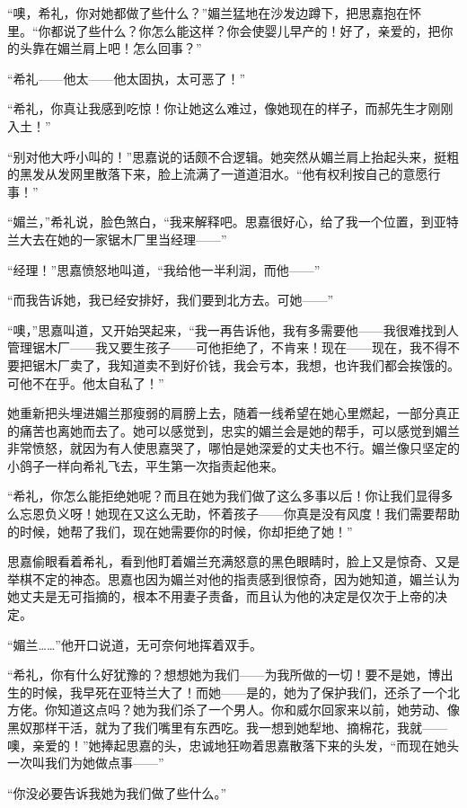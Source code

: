 \par “噢，希礼，你对她都做了些什么？”媚兰猛地在沙发边蹲下，把思嘉抱在怀里。“你都说了些什么？你怎么能这样？你会使婴儿早产的！好了，亲爱的，把你的头靠在媚兰肩上吧！怎么回事？”
\par “希礼——他太——他太固执，太可恶了！”
\par “希礼，你真让我感到吃惊！你让她这么难过，像她现在的样子，而郝先生才刚刚入土！”
\par “别对他大呼小叫的！”思嘉说的话颇不合逻辑。她突然从媚兰肩上抬起头来，挺粗的黑发从发网里散落下来，脸上流满了一道道泪水。“他有权利按自己的意愿行事！”
\par “媚兰，”希礼说，脸色煞白，“我来解释吧。思嘉很好心，给了我一个位置，到亚特兰大去在她的一家锯木厂里当经理——”
\par “经理！”思嘉愤怒地叫道，“我给他一半利润，而他——”
\par “而我告诉她，我已经安排好，我们要到北方去。可她——”
\par “噢，”思嘉叫道，又开始哭起来，“我一再告诉他，我有多需要他——我很难找到人管理锯木厂——我又要生孩子——可他拒绝了，不肯来！现在——现在，我不得不要把锯木厂卖了，我知道卖不到好价钱，我会亏本，我想，也许我们都会挨饿的。可他不在乎。他太自私了！”
\par 她重新把头埋进媚兰那瘦弱的肩膀上去，随着一线希望在她心里燃起，一部分真正的痛苦也离她而去了。她可以感觉到，忠实的媚兰会是她的帮手，可以感觉到媚兰非常愤怒，就因为有人使思嘉哭了，哪怕是她深爱的丈夫也不行。媚兰像只坚定的小鸽子一样向希礼飞去，平生第一次指责起他来。
\par “希礼，你怎么能拒绝她呢？而且在她为我们做了这么多事以后！你让我们显得多么忘恩负义呀！她现在又这么无助，怀着孩子——你真是没有风度！我们需要帮助的时候，她帮了我们，现在她需要你的时候，你却拒绝了她！”
\par 思嘉偷眼看着希礼，看到他盯着媚兰充满怒意的黑色眼睛时，脸上又是惊奇、又是举棋不定的神态。思嘉也因为媚兰对他的指责感到很惊奇，因为她知道，媚兰认为她丈夫是无可指摘的，根本不用妻子责备，而且认为他的决定是仅次于上帝的决定。
\par “媚兰……”他开口说道，无可奈何地挥着双手。
\par “希礼，你有什么好犹豫的？想想她为我们——为我所做的一切！要不是她，博出生的时候，我早死在亚特兰大了！而她——是的，她为了保护我们，还杀了一个北方佬。你知道这点吗？她为我们杀了一个男人。你和威尔回家来以前，她劳动、像黑奴那样干活，就为了我们嘴里有东西吃。我一想到她犁地、摘棉花，我就——噢，亲爱的！”她捧起思嘉的头，忠诚地狂吻着思嘉散落下来的头发，“而现在她头一次叫我们为她做点事——”
\par “你没必要告诉我她为我们做了些什么。”
